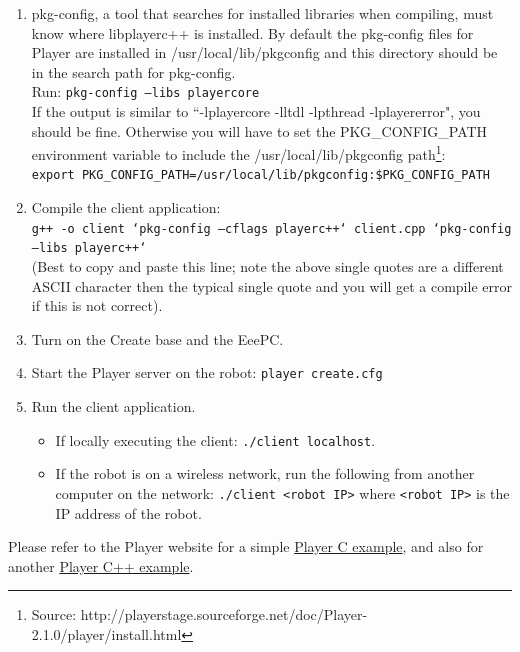 \begin{enumerate}
\item pkg-config, a tool that searches for installed libraries when compiling, must know where libplayerc++ is installed. By default the pkg-config files for Player are installed in /usr/local/lib/pkgconfig and this directory should be in the search path for pkg-config. \\
Run: \texttt{pkg-config --libs playercore}\\
If the output is similar to ``-lplayercore -lltdl -lpthread -lplayererror", you should be fine. Otherwise you will have to set the PKG\_CONFIG\_PATH environment variable to include the /usr/local/lib/pkgconfig path\footnote{Source: http://playerstage.sourceforge.net/doc/Player-2.1.0/player/install.html}:\\
\texttt{export PKG\_CONFIG\_PATH=/usr/local/lib/pkgconfig:\$PKG\_CONFIG\_PATH}

\item Compile the client application:\\
\texttt{g++ -o client `pkg-config --cflags playerc++` client.cpp `pkg-config --libs playerc++`}\\
(Best to copy and paste this line; note the above single quotes are a different ASCII character then the typical single quote and you will get a compile error if this is not correct).

\item Turn on the Create base and the EeePC.

\item Start the Player server on the robot: \texttt{player create.cfg}

\item Run the client application.
\begin{itemize}
\item If locally executing the client: \texttt{./client localhost}.
\item If the robot is on a wireless network, run the following from another computer on the network: \texttt{./client <robot IP>} where \texttt{<robot IP>} is the IP address of the robot.
\end{itemize}

\end{enumerate}

\noindent Please refer to the Player website for a simple \href{http://playerstage.sourceforge.net/doc/Player-2.1.0/player/group\_\_libplayerc\_\_example.html}{Player C example}, and also for another \href{http://playerstage.sourceforge.net/doc/Player-2.1.0/player/group\_\_cplusplus\_\_example.html}{Player C++ example}.

